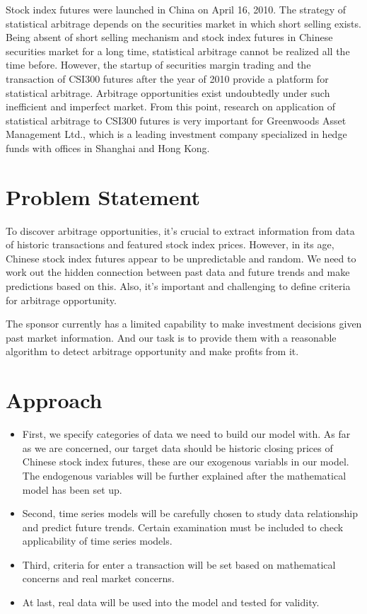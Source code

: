 \documentclass[12pt,letterpaper]{article}
\theoremstyle{definition}
\begin{document}
 \vspace{6pt}\noindent Stock index futures were launched in China on April 16, 2010. The strategy of statistical arbitrage depends on the securities market in which short selling exists. Being absent of short selling mechanism and stock index futures in Chinese securities market for a long time, statistical arbitrage cannot be realized all the time before. However, the startup of securities margin trading and the transaction of CSI300 futures after the year of 2010 provide a platform for statistical arbitrage. Arbitrage opportunities exist undoubtedly under such inefficient and imperfect market. From this point, research on application of statistical arbitrage to CSI300 futures is very important for Greenwoods Asset Management Ltd., which is a leading investment company specialized in hedge funds with offices in Shanghai and Hong Kong. 


\section{Problem Statement}

To discover arbitrage opportunities, it’s crucial to extract information from data of historic transactions and featured stock index prices. However, in its age, Chinese stock index futures appear to be unpredictable and random. We need to work out the hidden connection between past data and future trends and make predictions based on this. Also, it’s important and challenging to define criteria for arbitrage opportunity.

\vspace{6pt}\noindent The sponsor currently has a limited capability to make investment decisions given past market information. And our task is to provide them with a reasonable algorithm to detect arbitrage opportunity and make profits from it.


\section{Approach}
\begin{itemize}
    \item 	First, we specify categories of data we need to build our model with. As far as we are concerned, our target data should be historic closing prices of Chinese stock index futures, these are our exogenous variabls in our model. The endogenous variables will be further explained after the mathematical model has been set up.  
    \item 	Second, time series models will be carefully chosen to study data relationship and predict future trends. Certain examination must be included to check applicability of time series models.
    \item 	Third, criteria for enter a transaction will be set based on mathematical concerns and real market concerns.
    \item   At last, real data will be used into the model and tested for validity.
    
\end{itemize}
\end{document}
